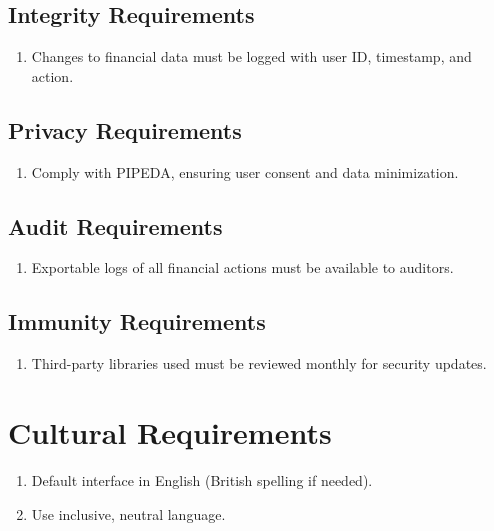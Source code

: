 \documentclass[12pt]{article}
\begin{document}
\subsection{Integrity Requirements}
\begin{enumerate}
  \item Changes to financial data must be logged with user ID, timestamp, and action.
\end{enumerate}

\subsection{Privacy Requirements}
\begin{enumerate}
  \item Comply with PIPEDA, ensuring user consent and data minimization.
\end{enumerate}

\subsection{Audit Requirements}
\begin{enumerate}
  \item Exportable logs of all financial actions must be available to auditors.
\end{enumerate}

\subsection{Immunity Requirements}
\begin{enumerate}
  \item Third-party libraries used must be reviewed monthly for security updates.
\end{enumerate}

\section{Cultural Requirements}
\begin{enumerate}
  \item Default interface in English (British spelling if needed).
  \item Use inclusive, neutral language.
\end{enumerate}

\end{document}
